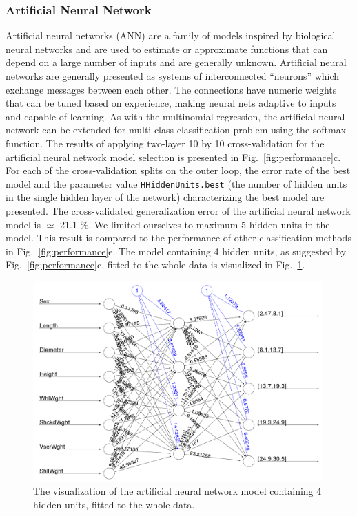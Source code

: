 \documentclass[10pt, paper=a4]{article}
\begin{document}
\subsubsection{Artificial Neural Network}  %
Artificial neural networks (ANN) are a family of models inspired by
biological neural networks and are used to estimate or approximate
functions that can depend on a large number of inputs and are
generally unknown.  Artificial neural networks are generally presented
as systems of interconnected ``neurons'' which exchange messages
between each other.  The connections have numeric weights that can be
tuned based on experience, making neural nets adaptive to inputs and
capable of learning.  As with the multinomial regression, the
artificial neural network can be extended for multi-class
classification problem using the softmax function.  The results of
applying two-layer 10 by 10 cross-validation for the artificial neural
network model selection is presented in Fig.~\ref{fig:performance}c.
For each of the cross-validation splits on the outer loop, the error
rate of the best model and the parameter value
\verb|HHiddenUnits.best| (the number of hidden units in the single
hidden layer of the network) characterizing the best model are
presented.  The cross-validated generalization error of the artificial
neural network model is $\simeq$ 21.1 \%.  We limited ourselves to
maximum 5 hidden units in the model. This result is compared to the
performance of other classification methods in
Fig.~\ref{fig:performance}e.  The model containing 4 hidden units, as
suggested by Fig.~\ref{fig:performance}c, fitted to the whole data is
visualized in Fig.~\ref{fig:ANN}.

\begin{figure}[h!]
  \centering
  \begin{minipage}{0.75\textwidth}
    \includegraphics[width = 0.99\textwidth]{ANN.png}
  \end{minipage} \vfill
  \caption{The visualization of the artificial neural network model
    containing 4 hidden units, fitted to the whole data.}
  \label{fig:ANN}
\end{figure}
\end{document}
